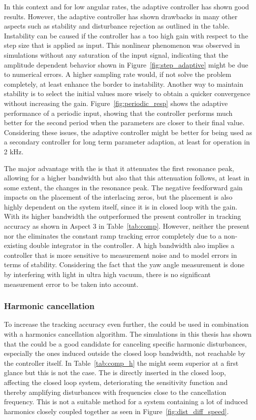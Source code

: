 In this context and for low angular rates, the adaptive controller has shown good results. However, the adaptive controller has shown drawbacks in many other aspects such as stability and disturbance rejection as outlined in the table. Instability can be caused if the controller has a too high gain with respect to the step size that is applied as input. This nonlinear phenomenon was observed in simulations without any saturation of the input signal, indicating that the amplitude dependent behavior shown in Figure~\ref{fig:step_adaptive} might be due to numerical errors. A higher sampling rate would, if not solve the problem completely, at least enhance the border to instability. Another way to maintain stability is to select the initial values more wisely to obtain a quicker convergence without increasing the gain. Figure~\ref{fig:periodic_resp} shows the adaptive performance of a periodic input, showing that the controller performs much better for the second period when the parameters are closer to their final value. Considering these issues, the adaptive controller might be better for being used as a secondary controller for long term parameter adaption, at least for operation in 2 kHz.

The major advantage with the \abbrIRC is that it attenuates the first resonance peak, allowing for a higher bandwidth but also that this attenuation follows, at least in some extent, the changes in the resonance peak. The negative feedforward gain impacts on the placement of the interlacing zeros, but the placement is also highly dependent on the system itself, since it is in closed loop with the gain. With its higher bandwidth the \abbrIRC outperformed the present controller in tracking accuracy as shown in Aspect 3 in Table~\ref{tab:comp}. However, neither the present nor the \abbrIRC eliminates the constant ramp tracking error completely due to a non-existing double integrator in the controller. A high bandwidth also implies a controller that is more sensitive to measurement noise and to model errors in terms of stability. Considering the fact that the yaw angle measurement is done by interfering with light in ultra high vacuum, there is no significant measurement error to be taken into account.

\subsubsection{Harmonic cancellation}
To increase the tracking accuracy even further, the \abbrIRC could be used in combination with a harmonics cancellation algorithm. The simulations in this thesis has shown that the \abbrRFDC could be a good candidate for canceling specific harmonic disturbances, especially the ones induced outside the closed loop bandwidth, not reachable by the controller itself. In Table~\ref{tab:comp_h} the \abbrIMP might seem superior at a first glance but this is not the case. The \abbrIMP is directly inserted in the closed loop, affecting the closed loop system, deteriorating the sensitivity function and thereby amplifying disturbances with frequencies close to the cancellation frequency. This is not a suitable method for a system containing a lot of induced harmonics closely coupled together as seen in Figure~\ref{fig:dist_diff_speed}.

